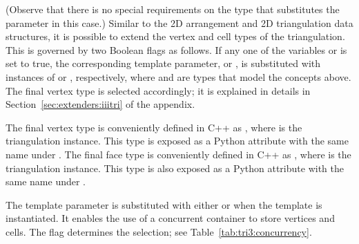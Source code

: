(Observe that there is no special requirements on the type that
substitutes the  parameter in this case.)
Similar to the 2D arrangement and 2D triangulation data structures,
it is possible to extend the vertex and cell types of the
triangulation. This is governed by two \cmake{} Boolean flags as
follows. If any one of the \cmake{} variables
 or
 is set to true, the
corresponding template parameter,  or ,
is substituted with instances of
or
,
respectively, where
 and  are types that model the
concepts above. The final vertex type is selected accordingly; it is
explained in details in Section~\ref{sec:extenders:iiitri} of the appendix.

The final vertex type is conveniently defined in C++ as
, where  is the
triangulation instance. This type is exposed as a Python attribute
with the same name under .
%
The final face type is conveniently defined in C++ as
, where  is the triangulation
instance. This type is also exposed as a Python attribute with the
same name under .

The template parameter  is substituted
with either  or
 when the template
 is
instantiated. It enables the use of a concurrent
container to store vertices and cells. The \cmake{} flag
 determines the selection; see
Table~\ref{tab:tri3:concurrency}.

\begin{table}[!htp]
  \caption{3D triangulation concurrency options}
  \centering{}
  \label{tab:tri3:concurrency}
\end{table}

